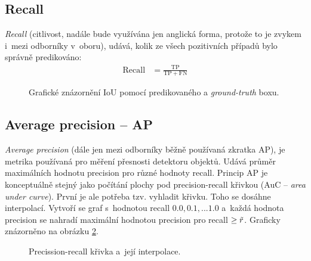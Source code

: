 \subsection*{Recall}
\emph{Recall} (citlivost, nadále bude využívána jen anglická forma, protože to je zvykem i~mezi odborníky v~oboru), udává, kolik ze všech pozitivních případů bylo správně predikováno:
\begin{align}
    \label{eq:recall}
    \mathrm{Recall} &= \frac{\mathrm{TP}}{\mathrm{TP} + \mathrm{FN}}
\end{align}
\begin{figure}[H]
    \centering
    \caption{Grafické znázornění IoU pomocí predikovaného a \emph{ground-truth} boxu.}
    \label{fig:priou}
\end{figure}    

\subsection*{Average precision -- AP}
\emph{Average precision} (dále jen mezi odborníky běžně používaná zkratka AP), je metrika používaná pro měření přesnosti detektoru objektů. Udává průměr maximálních hodnotu precision pro různé hodnoty recall. Princip AP je konceptuálně stejný jako počítání plochy pod precision-recall křivkou (AuC -- \emph{area under curve}). První je ale potřeba tzv. vyhladit křivku. Toho se dosáhne interpolací. Vytvoří se graf s~hodnotou recall  $0.0, 0.1, ... 1.0$ a~každá hodnota precision se nahradí maximální hodnotou precision pro recall $\geq \Tilde{r}$. Graficky znázorněno na obrázku \ref{fig:prcurve}.

\begin{figure}[H]
    \centering
    \caption{Precission-recall křivka a~její interpolace.}
    \label{fig:prcurve}
\end{figure}


